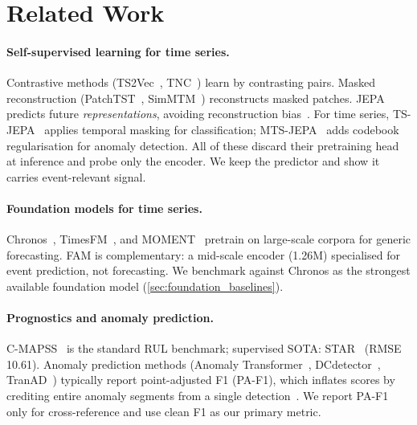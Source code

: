 \documentclass{article}
\begin{document}
\section{Related Work}
\label{sec:related}

\paragraph{Self-supervised learning for time series.}
Contrastive methods (TS2Vec~\citep{yue2022ts2vec}, TNC~\citep{tonekaboni2021tnc}) learn by contrasting pairs. Masked reconstruction (PatchTST~\citep{nie2023patchtst}, SimMTM~\citep{dong2023simmtm}) reconstructs masked patches. JEPA predicts future \emph{representations}, avoiding reconstruction bias~\citep{assran2023ijepa,bardes2024vjepa}. For time series, TS-JEPA~\citep{tsjepa2024} applies temporal masking for classification; MTS-JEPA~\citep{mtsjepa2026} adds codebook regularisation for anomaly detection. All of these discard their pretraining head at inference and probe only the encoder. We keep the predictor and show it carries event-relevant signal.

\paragraph{Foundation models for time series.}
Chronos~\citep{ansari2024chronos}, TimesFM~\citep{das2024timesfm}, and MOMENT~\citep{goswami2024moment} pretrain on large-scale corpora for generic forecasting. FAM is complementary: a mid-scale encoder (1.26M) specialised for event prediction, not forecasting. We benchmark against Chronos as the strongest available foundation model (\cref{sec:foundation_baselines}).

\paragraph{Prognostics and anomaly prediction.}
C-MAPSS~\citep{saxena2008cmapss} is the standard RUL benchmark; supervised SOTA: STAR~\citep{fan2024star} (RMSE 10.61). Anomaly prediction methods (Anomaly Transformer~\citep{xu2022anomalytransformer}, DCdetector~\citep{yang2023dcdetector}, TranAD~\citep{tuli2022tranad}) typically report point-adjusted F1 (PA-F1), which inflates scores by crediting entire anomaly segments from a single detection~\citep{schmidl2022tsadeval}. We report PA-F1 only for cross-reference and use clean F1 as our primary metric.
\end{document}
